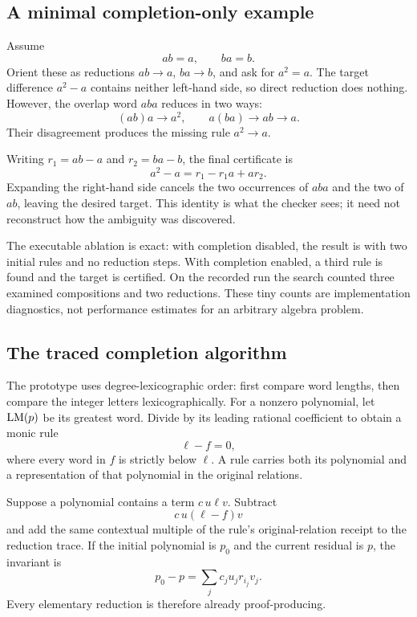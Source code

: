 \subsection{A minimal completion-only example}
Assume
\[
 ab=a,\qquad ba=b.
\]
Orient these as reductions \(ab\to a\), \(ba\to b\), and ask for \(a^2=a\). The target difference \(a^2-a\) contains neither left-hand side, so direct reduction does nothing. However, the overlap word \(aba\) reduces in two ways:
\[
 (ab)a\longrightarrow a^2,
 \qquad
 a(ba)\longrightarrow ab\longrightarrow a.
\]
Their disagreement produces the missing rule \(a^2\to a\).

Writing \(r_1=ab-a\) and \(r_2=ba-b\), the final certificate is
\begin{equation}\label{eq:nc-small}
 a^2-a=r_1-r_1a+ar_2.
\end{equation}
Expanding the right-hand side cancels the two occurrences of \(aba\) and the two of \(ab\), leaving the desired target. This identity is what the checker sees; it need not reconstruct how the ambiguity was discovered.

The executable ablation is exact: with completion disabled, the result is \unknown{} with two initial rules and no reduction steps. With completion enabled, a third rule is found and the target is certified. On the recorded run the search counted three examined compositions and two reductions. These tiny counts are implementation diagnostics, not performance estimates for an arbitrary algebra problem.

\subsection{The traced completion algorithm}
The prototype uses degree-lexicographic order: first compare word lengths, then compare the integer letters lexicographically. For a nonzero polynomial, let \(\operatorname{LM}(p)\) be its greatest word. Divide by its leading rational coefficient to obtain a monic rule
\[
 \ell-f=0,
\]
where every word in \(f\) is strictly below \(\ell\). A rule carries both its polynomial and a representation of that polynomial in the original relations.

Suppose a polynomial contains a term \(c\,u\ell v\). Subtract
\[
 c\,u(\ell-f)v
\]
and add the same contextual multiple of the rule's original-relation receipt to the reduction trace. If the initial polynomial is \(p_0\) and the current residual is \(p\), the invariant is
\begin{equation}\label{eq:reduction-invariant}
 p_0-p=\sum_j c_j u_jr_{i_j}v_j.
\end{equation}
Every elementary reduction is therefore already proof-producing.

